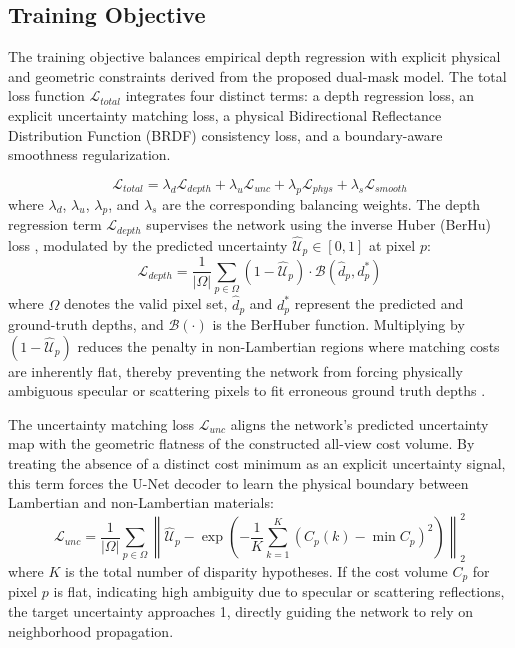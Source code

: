 \documentclass[lettersize,journal]{IEEEtran}
\begin{document}
\subsection{Training Objective}
The training objective balances empirical depth regression with explicit physical and geometric constraints derived from the proposed dual-mask model. The total loss function $\mathcal{L}_{total}$ integrates four distinct terms: a depth regression loss, an explicit uncertainty matching loss, a physical Bidirectional Reflectance Distribution Function (BRDF) consistency loss, and a boundary-aware smoothness regularization.

\begin{equation}
\mathcal{L}_{total} = \lambda_{d} \mathcal{L}_{depth} + \lambda_{u} \mathcal{L}_{unc} + \lambda_{p} \mathcal{L}_{phys} + \lambda_{s} \mathcal{L}_{smooth}
\end{equation}
where $\lambda_{d}$, $\lambda_{u}$, $\lambda_{p}$, and $\lambda_{s}$ are the corresponding balancing weights. The depth regression term $\mathcal{L}_{depth}$ supervises the network using the inverse Huber (BerHu) loss \cite{eigen2014}, modulated by the predicted uncertainty $\hat{\mathcal{U}}_p \in [0,1]$ at pixel $p$:
\begin{equation}
\mathcal{L}_{depth} = \frac{1}{|\Omega|} \sum_{p \in \Omega} (1 - \hat{\mathcal{U}}_p) \cdot \mathcal{B}(\hat{d}_p, d^*_p)
\end{equation}
where $\Omega$ denotes the valid pixel set, $\hat{d}_p$ and $d^*_p$ represent the predicted and ground-truth depths, and $\mathcal{B}(\cdot)$ is the BerHuber function. Multiplying by $(1 - \hat{\mathcal{U}}_p)$ reduces the penalty in non-Lambertian regions where matching costs are inherently flat, thereby preventing the network from forcing physically ambiguous specular or scattering pixels to fit erroneous ground truth depths \cite{godard2019}.

The uncertainty matching loss $\mathcal{L}_{unc}$ aligns the network's predicted uncertainty map with the geometric flatness of the constructed all-view cost volume. By treating the absence of a distinct cost minimum as an explicit uncertainty signal, this term forces the U-Net decoder \cite{ronneberger2015} to learn the physical boundary between Lambertian and non-Lambertian materials:
\begin{equation}
\mathcal{L}_{unc} = \frac{1}{|\Omega|} \sum_{p \in \Omega} \left\| \hat{\mathcal{U}}_p - \exp\left( -\frac{1}{K} \sum_{k=1}^{K} (C_p(k) - \min C_p)^2 \right) \right\|_2^2
\end{equation}
where $K$ is the total number of disparity hypotheses. If the cost volume $C_p$ for pixel $p$ is flat, indicating high ambiguity due to specular or scattering reflections, the target uncertainty approaches 1, directly guiding the network to rely on neighborhood propagation.
\end{document}
